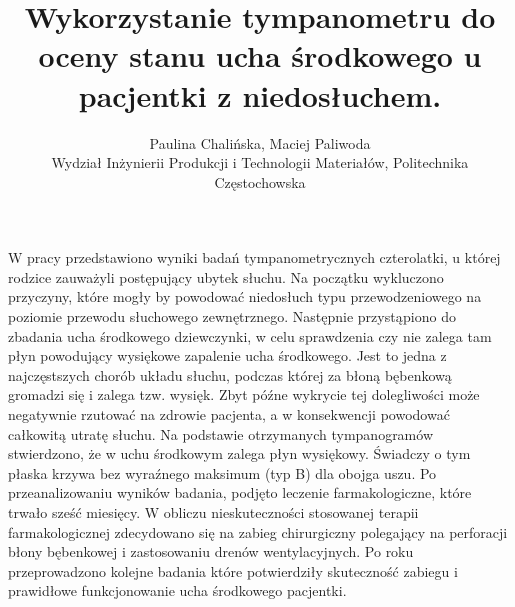 \documentclass[12pt, a4paper]{article}
\begin{document}
\title{Wykorzystanie tympanometru do oceny stanu ucha środkowego u pacjentki z niedosłuchem.}
\author{Paulina Chalińska, Maciej Paliwoda \\ Wydział Inżynierii Produkcji i Technologii Materiałów, Politechnika Częstochowska}
\date {}
\maketitle
\thispagestyle{title}
     W pracy przedstawiono wyniki badań tympanometrycznych czterolatki, u której rodzice zauważyli postępujący ubytek słuchu. Na początku wykluczono przyczyny, które mogły by powodować niedosłuch typu przewodzeniowego na poziomie przewodu słuchowego zewnętrznego. Następnie przystąpiono do zbadania ucha środkowego dziewczynki, w celu sprawdzenia czy nie zalega tam płyn powodujący wysiękowe zapalenie ucha środkowego. Jest to jedna z najczęstszych chorób układu słuchu, podczas której za błoną bębenkową gromadzi się i zalega tzw. wysięk. Zbyt późne wykrycie tej dolegliwości może negatywnie rzutować na zdrowie pacjenta, a w konsekwencji powodować całkowitą utratę słuchu. Na podstawie otrzymanych tympanogramów stwierdzono, że w uchu środkowym zalega płyn wysiękowy. Świadczy o tym płaska krzywa bez wyraźnego maksimum (typ B) dla obojga uszu. Po przeanalizowaniu wyników badania, podjęto leczenie farmakologiczne, które trwało sześć miesięcy. W obliczu nieskuteczności stosowanej terapii farmakologicznej zdecydowano się na zabieg chirurgiczny polegający na perforacji błony bębenkowej i zastosowaniu drenów wentylacyjnych. Po roku przeprowadzono kolejne badania które potwierdziły skuteczność zabiegu i prawidłowe funkcjonowanie ucha środkowego pacjentki.
\end{document}
